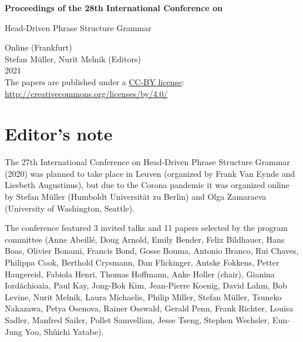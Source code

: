 \documentclass[11pt,a4paper,fleqn]{article}
\begin{document}
\begin{center}
{\Large
                {\bfseries Proceedings of the 28th International Conference on\par Head-Driven Phrase Structure Grammar\par}

                \vspace{8ex}

                     Online (Frankfurt)\\[\baselineskip]

                        Stefan  M{\"u}ller, Nurit Melnik (Editors)\\[\baselineskip]

                                2021\\[\baselineskip]



The papers are published under a \href{http://creativecommons.org/licenses/by/4.0/}{CC-BY license}:\\[3pt]
\href{http://creativecommons.org/licenses/by/4.0/}{http://creativecommons.org/licenses/by/4.0/}
}
\end{center}
\newpage
\tableofcontents

\newpage

\section*{Editor's note}
The 27th International Conference on Head-Driven Phrase Structure Grammar (2020) was planned to take
place in Leuven (organized by Frank Van Eynde and Liesbeth Augustinus), but due to the Corona
pandemic it was organized online by Stefan Müller (Humboldt Universität zu Berlin) and Olga
Zamaraeva (University of Washington, Seattle).


The conference featured 3 invited talks and 11 papers selected by the program committee 
(Anne Abeillé, 
    Doug Arnold,
    Emily Bender,
    Felix Bildhauer,
    Hans Boas,
    Olivier Bonami,
    Francis Bond, 
    Gosse Bouma, 
    Antonio Branco, 
    Rui Chaves, 
    Philippa Cook, 
    Berthold Crysmann,
    Dan Flickinger, 
    Antske Fokkens, 
    Petter Haugereid, 
    Fabiola Henri, 
    Thomas Hoffmann, 
    Anke Holler (chair),
    Gianina Iordăchioaia,
    Paul Kay, 
    Jong-Bok Kim, 
    Jean-Pierre Koenig, 
    David Lahm, 
    Bob Levine, 
    Nurit Melnik, 
    Laura Michaelis, 
    Philip Miller, 
    Stefan Müller, 
    Tsuneko Nakazawa, 
    Petya Osenova, 
    Rainer Osswald, 
    Gerald Penn, 
    Frank Richter, 
    Louisa Sadler, 
    Manfred Sailer, 
    Pollet Samvellian, 
    Jesse Tseng, 
    Stephen Wechsler, 
    Eun-Jung Yoo, 
    Shûichi Yatabe).
\end{document}

